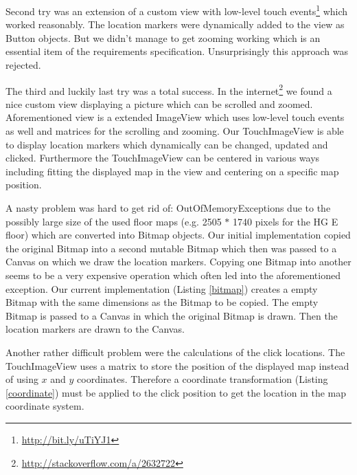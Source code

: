 Second try was an extension of a custom view with low-level touch events\footnote{\url{http://bit.ly/uTiYJ1}} which worked reasonably. The location markers were dynamically added to the view as Button objects. But we didn't manage to get zooming working which is an essential item of the requirements specification. Unsurprisingly this approach was rejected.

The third and luckily last try was a total success. In the internet\footnote{\url{http://stackoverflow.com/a/2632722}} we found a nice custom view displaying a picture which can be scrolled and zoomed. Aforementioned view is a extended ImageView which uses low-level touch events as well and matrices for the scrolling and zooming. Our TouchImageView is able to display location markers which dynamically can be changed, updated and clicked. Furthermore the TouchImageView can be centered in various ways including fitting the displayed map in the view and centering on a specific map position.

A nasty problem was hard to get rid of: OutOfMemoryExceptions due to the possibly large size of the used floor maps (e.g. 2505 $*$ 1740 pixels for the HG E floor) which are converted into Bitmap objects. Our initial implementation copied the original Bitmap into a second mutable Bitmap which then was passed to a Canvas on which we draw the location markers. Copying one Bitmap into another seems to be a very expensive operation which often led into the aforementioned exception. Our current implementation (Listing \ref{bitmap}) creates a empty Bitmap with the same dimensions as the Bitmap to be copied. The empty Bitmap is passed to a Canvas in which the original Bitmap is drawn. Then the location markers are drawn to the Canvas.



Another rather difficult problem were the calculations of the click locations. The TouchImageView uses a matrix to store the position of the displayed map instead of using $x$ and $y$ coordinates. Therefore a coordinate transformation (Listing \ref{coordinate}) must be applied to the click position to get the location in the map coordinate system.

